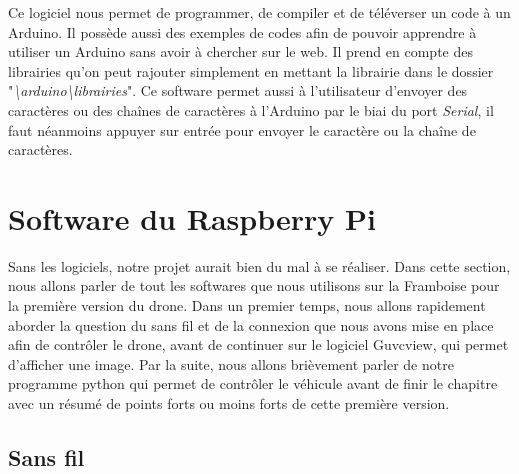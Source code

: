 \documentclass[a4paper,11pt]{report}
\begin{document}
{\begin{figure}[h!]
\begin{center}
\end{center}
\end{figure}
Ce logiciel nous permet de programmer, de compiler et de téléverser un code à un Arduino. Il possède aussi des exemples de codes afin de pouvoir apprendre à utiliser un Arduino sans avoir à chercher sur le web. Il prend en compte des librairies qu'on peut rajouter simplement en mettant la librairie dans le dossier "\textit{\textbackslash arduino\textbackslash librairies}". Ce software permet aussi à l'utilisateur d'envoyer des caractères ou des chaînes de caractères à l'Arduino par le biai du port \textit{Serial}, il faut néanmoins appuyer sur entrée pour envoyer le caractère ou la chaîne de caractères.


\section{Software du Raspberry Pi}

Sans les logiciels, notre projet aurait bien du mal à se réaliser. Dans cette section, nous allons parler de tout les softwares que nous utilisons sur la Framboise pour la première version du drone. Dans un premier temps, nous allons rapidement aborder la question du sans fil et de la connexion que nous avons mise en place afin de contrôler le drone, avant de continuer sur le logiciel Guvcview, qui permet d'afficher une image. Par la suite, nous allons brièvement parler de notre programme python qui permet de contrôler le véhicule avant de finir le chapitre avec un résumé de points forts ou moins forts de cette première version.




\subsection{Sans fil}

}
\end{document}
